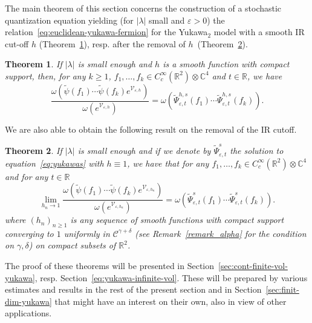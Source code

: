 \documentclass{article}
\newtheorem{theorem}{Theorem}
\begin{document}
The main theorem of this section concerns the construction of a stochastic
quantization equation yielding (for $| \lambda |$ small and $\varepsilon > 0$)
the relation~{\eqref{eq:euclidean-yukawa-fermion}} for the Yukawa$_2$ model
with a smooth IR cut-off $h$ (Theorem~\ref{theorem_main1}), resp. after the
removal of $h$~(Theorem~\ref{theorem_main2}).

\begin{theorem}
  \label{theorem_main1}If $| \lambda |$ is small enough and $h$ is a smooth
  function with compact support, then, for any $k \geqslant 1$, $f_1, \ldots,
  f_k \in C^{\infty}_c (\mathbb{R}^2) \otimes \mathbb{C}^4$ and $t \in
  \mathbb{R}$, we have
  \begin{equation}
    \frac{\omega (\tilde{\psi} (f_1) \cdots \tilde{\psi} (f_k)
    e^{\mathcal{V}_{\varepsilon, h}})}{\omega (e^{\mathcal{V}_{\varepsilon,
    h}})} = \omega (\tilde{\Psi}_{\varepsilon, t}^{h, s} (f_1) \cdots
    \tilde{\Psi}_{\varepsilon, t}^{h, s} (f_k)) .
  \end{equation}
\end{theorem}

We are also able to obtain the following result on the removal of the IR
cutoff.

\begin{theorem}
  \label{theorem_main2}If $| \lambda |$ is small enough and if we denote by
  $\tilde{\Psi}_{\varepsilon, t}^s$ the solution to
  equation~{\eqref{eq:yukawas}} with $h \equiv 1$, we have that for any $f_1,
  \ldots, f_k \in C^{\infty}_c (\mathbb{R}^2) \otimes \mathbb{C}^4$ and for
  any $t \in \mathbb{R}$
  \begin{equation}
    \lim_{h_n \rightarrow 1} \frac{\omega \left( \tilde{\psi} (f_1) \cdots
    \tilde{\psi} (f_k) e^{\mathcal{V}_{\varepsilon, h_n}} \right)}{\omega
    \left( e^{\mathcal{V}_{\varepsilon, h_n}} \right)} = \omega
    (\tilde{\Psi}_{\varepsilon, t}^s (f_1) \cdots \tilde{\Psi}_{\varepsilon,
    t}^s (f_k)) .
  \end{equation}
  where $(h_n)_{n \geqslant 1}$ is any sequence of smooth functions with
  compact support converging to $1$ uniformly in $\mathcal{C}^{\gamma +
  \delta}$ (see Remark~\ref{remark_alpha} for the condition on $\gamma,
  \delta$) on compact subsets of $\mathbb{R}^2$.
\end{theorem}

The proof of these theorems will be presented in
Section~\ref{sec:cont-finite-vol-yukawa}, resp.
Section~\ref{eq:yukawa-infinite-vol}. These will be prepared by various
estimates and results in the rest of the present section and in
Section~\ref{sec:finit-dim-yukawa} that might have an interest on their own,
also in view of other applications.
\end{document}
